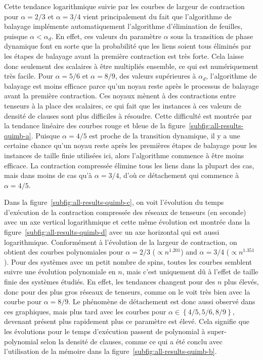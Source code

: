 Cette tendance logarithmique suivie par les courbes de largeur de contraction pour $\alpha = 2/3$ et $\alpha = 3/4$ vient principalement du fait que l'algorithme de balayage implémente automatiquement l'algorithme d'élimination de feuilles, puisque $\alpha < \alpha_d$.
En effet, ces valeurs du paramètre $\alpha$ sous la transition de phase dynamique font en sorte que la probabilité que les liens soient tous éliminés par les étapes de balayage avant la première contraction est très forte.
Cela laisse donc seulement des scalaires à être multipliés ensemble, ce qui est numériquement très facile.
Pour $\alpha = 5/6$ et $\alpha = 8/9$, des valeurs supérieures à $\alpha_d$, l'algorithme de balayage est moins efficace parce qu'un noyau reste après le processus de balayage avant la première contraction.
Ces noyaux mènent à des contractions entre tenseurs à la place des scalaires, ce qui fait que les instances à ces valeurs de densité de clauses sont plus difficiles à résoudre.
Cette difficulté est montrée par la tendance linéaire des courbes rouge et bleue de la figure~\ref{subfig:all-results-quimb-a}.
Puisque $\alpha = 4/5$ est proche de la transition dynamique, il y a une certaine chance qu'un noyau reste après les premières étapes de balayage pour les instances de taille finie utilisées ici, alors l'algorithme commence à être moins efficace.
La contraction compressée élimine tous les liens dans la plupart des cas, mais dans moins de cas qu'à $\alpha = 3/4$, d'où ce détachement qui commence à $\alpha = 4/5$.

Dans la figure~\ref{subfig:all-results-quimb-c}, on voit l'évolution du temps d'exécution de la contraction compressée des réseaux de tenseurs (en seconde) avec un axe vertical logarithmique et cette même évolution est montrée dans la figure~\ref{subfig:all-results-quimb-d} avec un axe horizontal qui est aussi logarithmique.
Conformément à l'évolution de la largeur de contraction, on obtient des courbes polynomiales pour $\alpha = 2/3$ ($\propto n^{1.201}$) and $\alpha=3/4$ ($\propto n^{1.351}$).
Pour des systèmes avec un petit nombre de spins, toutes les courbes semblent suivre une évolution polynomiale en $n$, mais c'est uniquement dû à l'effet de taille finie des systèmes étudiés.
En effet, les tendances changent pour des $n$ plus élevés, donc pour des plus gros réseaux de tenseurs, comme on le voit très bien avec la courbe pour $\alpha = 8/9$.
Le phénomène de détachement est donc aussi observé dans ces graphiques, mais plus tard avec les courbes pour $\alpha \in \left\{4/5, 5/6, 8/9 \right\}$, devenant présent plus rapidement plus ce paramètre est élevé.
Cela signifie que les évolutions pour le temps d'exécution passent de polynomial à super-polynomial selon la densité de clauses, comme ce qui a été conclu avec l'utilisation de la mémoire dans la figure~\ref{subfig:all-results-quimb-b}.

